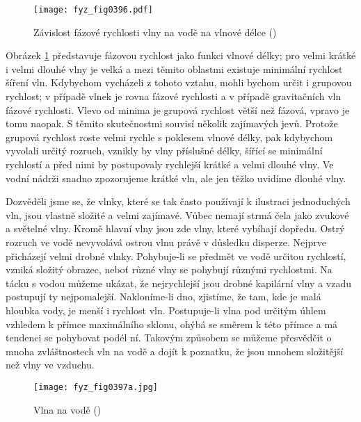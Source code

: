   \begin{figure}[ht!] %
    \centering
    \texttt{[image: fyz\_fig0396.pdf]}
    \caption{Závislost fázové rychlosti vlny na vodě na vlnové délce
             (\cite[s.~697]{Feynman01})}
    \label{fyz:fig0396}
  \end{figure}
  Obrázek \ref{fyz:fig0396} představuje fázovou rychlost jako funkci vlnové délky; pro velmi krátké
  i velmi dlouhé vlny je velká a mezi těmito oblastmi existuje minimální rychlost šíření vln.
  Kdybychom vycházeli z tohoto vztahu, mohli bychom určit i grupovou rychlost; v případě vlnek je
  rovna  fázové rychlosti a v případě gravitačních vln  fázové rychlosti.
  Vlevo od minima je grupová rychlost větší  než fázová, vpravo je tomu naopak. S těmito
  skutečnostmi souvisí několik zajímavých jevů. Protože grupová rychlost roste velmi rychle s
  poklesem vlnové délky, pak kdybychom vyvolali určitý rozruch, vznikly by vlny příslušné délky,
  šířící se minimální rychlostí a před nimi by postupovaly rychlejší krátké a velmi dlouhé vlny. Ve
  vodní nádrži snadno zpozorujeme krátké vln, ale jen těžko uvidíme dlouhé vlny. 
  
  Dozvěděli jsme se, že vlnky, které se tak často používají k ilustraci jednoduchých vln, jsou 
  vlastně složité a velmi zajímavé. Vůbec nemají strmá čela jako zvukové a světelné vlny. Kromě 
  hlavní vlny jsou zde vlny, které vybíhají dopředu. Ostrý rozruch ve vodě nevyvolává ostrou vlnu 
  právě v důsledku disperze. Nejprve přicházejí velmi drobné vlnky. Pohybuje-li se předmět ve vodě 
  určitou rychlostí, vzniká složitý obrazec, neboť různé vlny se pohybují různými rychlostmi. Na 
  tácku s vodou můžeme ukázat, že nejrychlejší jsou drobné kapilární vlny a vzadu postupují ty 
  nejpomalejší. Nakloníme-li dno, zjistíme, že tam, kde je malá hloubka vody, je menší i rychlost 
  vln. Postupuje-li vlna pod určitým úhlem vzhledem k přímce maximálního sklonu, ohýbá se směrem k 
  této přímce a má tendenci se pohybovat podél ní. Takovým způsobem se můžeme přesvědčit o mnoha 
  zvláštnostech vln na vodě a dojít k poznatku, že jsou mnohem složitější než vlny ve vzduchu. 


  \begin{figure}[ht!] %
    \centering
    \texttt{[image: fyz\_fig0397a.jpg]}
    \caption{Vlna na vodě
             (\cite[s.~697]{Feynman01})}
    \label{fyz:fig0397}
  \end{figure}
  
